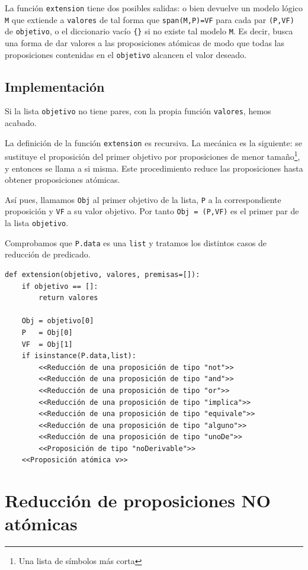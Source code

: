 \documentclass[10pt,a4paper]{report}
\begin{document}
La función \texttt{extension} tiene dos posibles salidas:
o bien devuelve un modelo lógico \texttt{M} que extiende a \texttt{valores} de tal forma que \texttt{span(M,P)=VF} para cada par \texttt{(P,VF)} de \texttt{objetivo},
o el diccionario vacío \texttt{\{\}} si no existe tal modelo \texttt{M}.
Es decir,
busca una forma de dar valores a las proposiciones atómicas de modo que todas las proposiciones contenidas en el \texttt{objetivo} alcancen el valor deseado.
\subsection{Implementación}
\label{sec:org1d8a1d3}

Si la lista \texttt{objetivo} no tiene pares, con la propia función \texttt{valores}, hemos acabado.

La definición de la función \texttt{extension} es recursiva.
La mecánica es la siguiente: se sustituye el proposición del primer objetivo por proposiciones de menor tamaño\footnote{Una lista de símbolos más corta}, y entonces se llama a si misma.
Este procedimiento reduce las proposiciones hasta obtener proposiciones atómicas.

Así pues, llamamos \texttt{Obj} al primer objetivo de la lista, \texttt{P} a la correspondiente proposición y \texttt{VF} a su valor objetivo.
Por tanto \texttt{Obj = (P,VF)} es el primer par de la lista \texttt{objetivo}.

Comprobamos que \texttt{P.data} es una \texttt{list} y tratamos los distintos casos de reducción de predicado.

\begin{verbatim}
def extension(objetivo, valores, premisas=[]):
    if objetivo == []:
        return valores

    Obj = objetivo[0]
    P   = Obj[0]
    VF  = Obj[1]
    if isinstance(P.data,list):
        <<Reducción de una proposición de tipo "not">>
        <<Reducción de una proposición de tipo "and">>
        <<Reducción de una proposición de tipo "or">>
        <<Reducción de una proposición de tipo "implica">>
        <<Reducción de una proposición de tipo "equivale">>
        <<Reducción de una proposición de tipo "alguno">>
        <<Reducción de una proposición de tipo "unoDe">>
        <<Proposición de tipo "noDerivable">>
    <<Proposición atómica v>>
\end{verbatim}
\section{Reducción de proposiciones NO atómicas}
\label{sec:org039e846}
\end{document}
